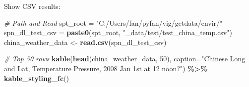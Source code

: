 \documentclass[
]{book}
\newenvironment{Shaded}{\begin{snugshade}}{\end{snugshade}}
\newcommand{\CommentTok}[1]{\textcolor[rgb]{0.56,0.35,0.01}{\textit{#1}}}
\newcommand{\DataTypeTok}[1]{\textcolor[rgb]{0.13,0.29,0.53}{#1}}
\newcommand{\DecValTok}[1]{\textcolor[rgb]{0.00,0.00,0.81}{#1}}
\newcommand{\KeywordTok}[1]{\textcolor[rgb]{0.13,0.29,0.53}{\textbf{#1}}}
\newcommand{\NormalTok}[1]{#1}
\newcommand{\OperatorTok}[1]{\textcolor[rgb]{0.81,0.36,0.00}{\textbf{#1}}}
\newcommand{\StringTok}[1]{\textcolor[rgb]{0.31,0.60,0.02}{#1}}
\begin{document}
Show CSV results:

\begin{Shaded}
\begin{Highlighting}[]
\CommentTok{\# Path and Read}
\NormalTok{spt\_root =}\StringTok{ "C:/Users/fan/pyfan/vig/getdata/envir/"}
\NormalTok{spn\_dl\_test\_csv =}\StringTok{ }\KeywordTok{paste0}\NormalTok{(spt\_root, }\StringTok{"\_data/test/test\_china\_temp.csv"}\NormalTok{)}
\NormalTok{china\_weather\_data \textless{}{-}}\StringTok{ }\KeywordTok{read.csv}\NormalTok{(spn\_dl\_test\_csv)}

\CommentTok{\# Top 50 rows}
\KeywordTok{kable}\NormalTok{(}\KeywordTok{head}\NormalTok{(china\_weather\_data, }\DecValTok{50}\NormalTok{),}
      \DataTypeTok{caption=}\StringTok{"Chinese Long and Lat, Temperature Pressure, 2008 Jan 1st at 12 noon?"}\NormalTok{) }\OperatorTok{\%\textgreater{}\%}
\StringTok{  }\KeywordTok{kable\_styling\_fc}\NormalTok{()}
\end{Highlighting}
\end{Shaded}
\end{document}
